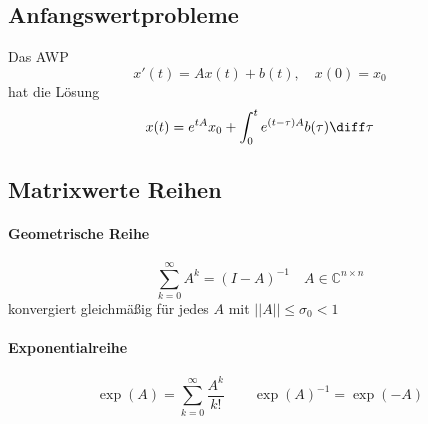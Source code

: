 \subsection{Anfangswertprobleme}
\begin{sectionbox}
    Das AWP \begin{equation*}
        x'(t) = Ax(t) + b(t), \quad x(0) = x_0
    \end{equation*}
    hat die Lösung
    \begin{equation*}
        x(t)=e^{tA}x_0 + \int_0^t e^{(t-\tau)A}b(\tau)\diff\tau
    \end{equation*}
\end{sectionbox}

\subsection{Matrixwerte Reihen}
\begin{sectionbox}
    \paragraph{Geometrische Reihe}
    \begin{equation*}
        \sum_{k=0}^\infty A^k = (I-A)^{-1} \quad A\in\mathbb C^{n\times n}
    \end{equation*}
    konvergiert gleichmäßig für jedes $A$ mit $||A||\le \sigma_0 < 1$

    \paragraph{Exponentialreihe}
    \begin{equation*}
        \exp(A)=\sum_{k=0}^{\infty}\frac{A^k}{k!} \qquad \exp(A)^{-1} = \exp(-A)
    \end{equation*}
\end{sectionbox}